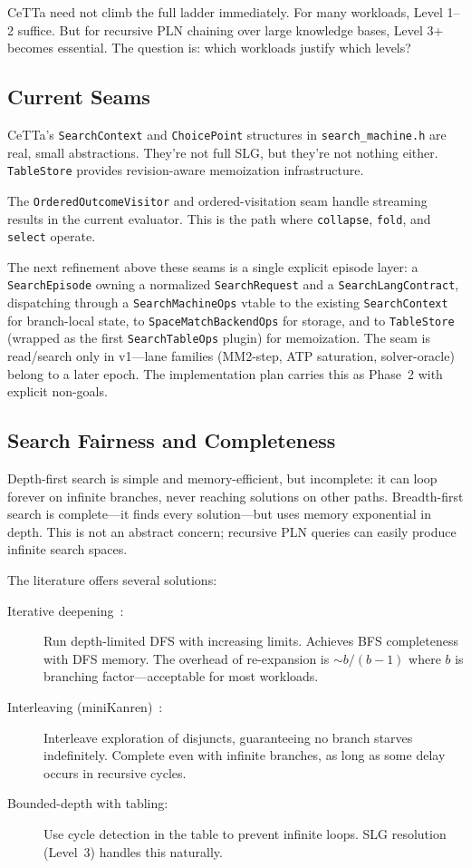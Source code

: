 \documentclass[11pt]{article}
\newcommand{\code}[1]{\texttt{#1}}
\newcommand{\CeTTa}{\textup{CeTTa}}
\begin{document}
\CeTTa{} need not climb the full ladder immediately.  For many workloads,
Level 1--2 suffice.  But for recursive PLN chaining over large knowledge
bases, Level 3+ becomes essential.  The question is: which workloads
justify which levels?

\subsection{Current Seams}

\CeTTa{}'s \code{SearchContext} and \code{ChoicePoint} structures in
\code{search\_machine.h} are real, small abstractions.  They're not
full SLG, but they're not nothing either.  \code{TableStore} provides
revision-aware memoization infrastructure.

The \code{OrderedOutcomeVisitor} and ordered-visitation seam handle
streaming results in the current evaluator.  This is the path where
\code{collapse}, \code{fold}, and \code{select} operate.

The next refinement above these seams is a single explicit episode
layer: a \code{SearchEpisode} owning a normalized \code{SearchRequest}
and a \code{SearchLangContract}, dispatching through a
\code{SearchMachineOps} vtable to the existing \code{SearchContext}
for branch-local state, to \code{SpaceMatchBackendOps} for storage,
and to \code{TableStore} (wrapped as the first \code{SearchTableOps}
plugin) for memoization.  The seam is read/search only in v1---lane
families (MM2-step, ATP saturation, solver-oracle) belong to a later
epoch.  The implementation plan carries this as Phase~2 with explicit
non-goals.

\subsection{Search Fairness and Completeness}

Depth-first search is simple and memory-efficient, but incomplete: it can
loop forever on infinite branches, never reaching solutions on other paths.
Breadth-first search is complete---it finds every solution---but uses
memory exponential in depth.  This is not an abstract concern; recursive
PLN queries can easily produce infinite search spaces.

The literature offers several solutions:
\begin{description}
\item[Iterative deepening~\cite{Korf1985}:] Run depth-limited DFS with
  increasing limits.  Achieves BFS completeness with DFS memory.  The
  overhead of re-expansion is $\sim b/(b{-}1)$ where $b$ is branching
  factor---acceptable for most workloads.
\item[Interleaving (miniKanren)~\cite{FriedmanByrd2005}:] Interleave
  exploration of disjuncts, guaranteeing no branch starves indefinitely.
  Complete even with infinite branches, as long as some delay occurs
  in recursive cycles.
\item[Bounded-depth with tabling:] Use cycle detection in the table to
  prevent infinite loops.  SLG resolution (Level~3) handles this naturally.
\end{description}
\end{document}
